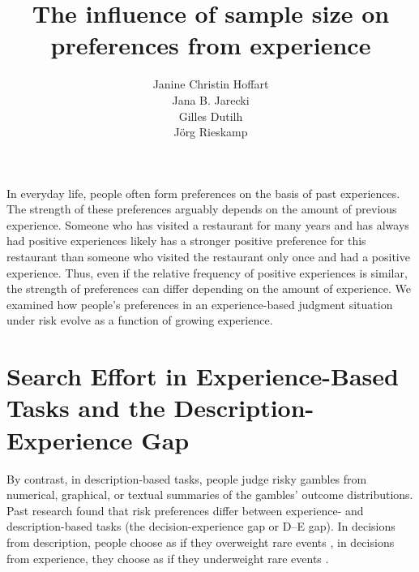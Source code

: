 \documentclass[a4paper, man, natbib, floatsintext]{apa6}
\title{The influence of sample size on preferences from experience}
\author{Janine Christin Hoffart\\Jana B. Jarecki\\Gilles Dutilh\\J\"org Rieskamp}
\affiliation{University of Basel, Department of Psychology, Center for Economic Psychology}
\begin{document}
\maketitle

In everyday life, people often form preferences on the basis of past experiences. The strength of these preferences arguably depends on the amount of previous experience. Someone who has visited a restaurant for many years and has always had positive experiences likely has a stronger positive preference for this restaurant than someone who visited the restaurant only once and had a positive experience. Thus, even if the relative frequency of positive experiences is similar, the strength of preferences can differ depending on the amount of experience. We examined how people's preferences in an experience-based judgment situation under risk evolve as a function of growing experience. 


\section{Search Effort in Experience-Based Tasks and the Description-Experience Gap}
 By contrast, in description-based tasks, people judge risky gambles from numerical, graphical, or textual summaries of the gambles' outcome distributions. Past research found that risk preferences differ between experience- and description-based tasks (the decision-experience gap or D--E gap). In decisions from description, people choose as if they overweight rare events \citep{Kahneman1979}, in decisions from experience, they choose as if they underweight rare events \citep{Hertwig2004}.
\end{document}
